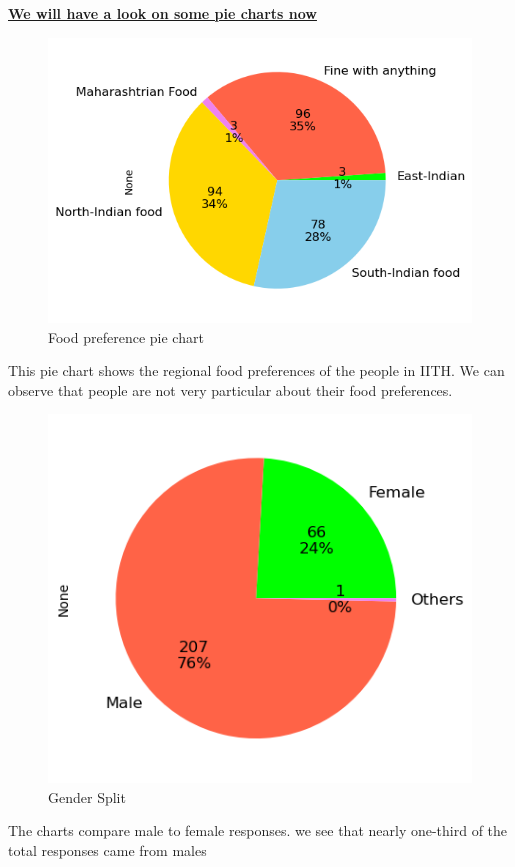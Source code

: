 \documentclass{article}
\begin{document}
\centerline{\underline{\bfseries{We will have a look on some pie charts now}}}
\begin{figure}[H]
    \centering
    \includegraphics[scale = 0.9]{pie_food_pref.png}
    \caption{Food preference pie chart}  
    \label{fig:pie_food_pref}
\end{figure}
This pie chart shows the regional food preferences of the people in IITH. We can observe that people are not very particular about their food preferences.
\begin{figure}[H]
    \centering
    \includegraphics[scale = 0.9]{pie_gender.png}
    \caption{Gender Split}  
    \label{fig:pie_gender}
\end{figure}
The charts compare male to female responses. we see that nearly one-third of the total responses came from males
\end{document}
